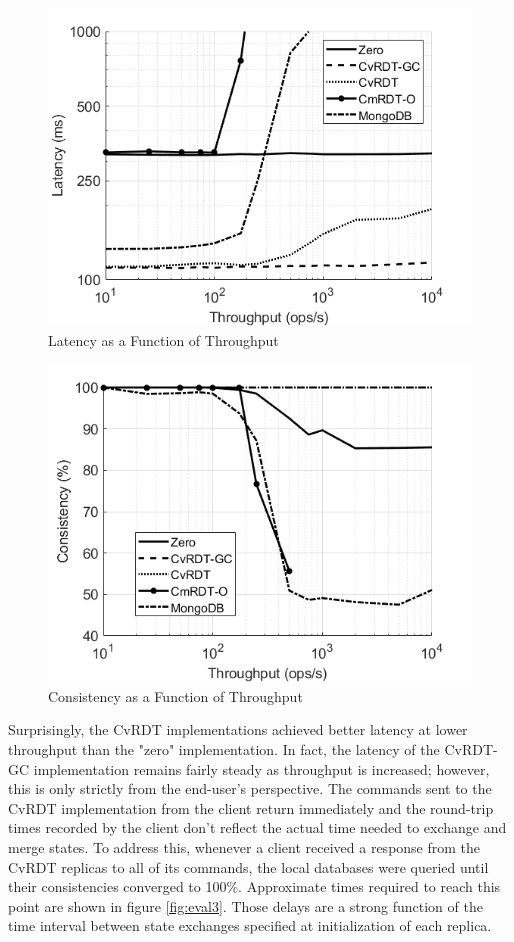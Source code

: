 \documentclass[sigconf,nonacm,10pt]{acmart}
\begin{document}
\begin{figure}[h]
  \centering
  \includegraphics[width=\linewidth]{Fig7TPLat3}
  \caption{Latency as a Function of Throughput}
  \label{fig:eval1}
\end{figure}

\begin{figure}[h]
  \centering
  \includegraphics[width=\linewidth]{Fig8TPCon3}
  \caption{Consistency as a Function of Throughput}
  \label{fig:eval2}
\end{figure}

Surprisingly, the CvRDT implementations achieved better latency at lower throughput than the "zero" implementation. In fact, the latency of the CvRDT-GC implementation remains fairly steady as throughput is increased; however, this is only strictly from the end-user's perspective. The commands sent to the CvRDT implementation from the client return immediately and the round-trip times recorded by the client don't reflect the actual time needed to exchange and merge states. To address this, whenever a client received a response from the CvRDT replicas to all of its commands, the local databases were queried until their consistencies converged to 100\%. Approximate times required to reach this point are shown in figure \ref{fig:eval3}. Those delays are a strong function of the time interval between state exchanges specified at initialization of each replica.
\end{document}
